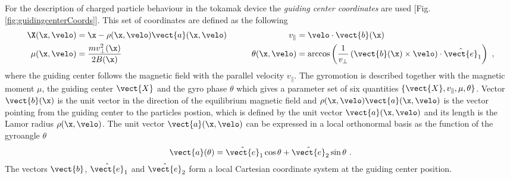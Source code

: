 For the description of charged particle behaviour in the tokamak device the \textit{guiding center coordinates} are used [Fig. \ref{fig:guidingcenterCoords}]. This set of coordinates are defined as the following
\begin{gather}
    \begin{aligned}
        \X(\x,\velo) &= \x - \rho(\x,\velo)\vect{a}(\x,\velo) &\qquad v_\parallel &= \velo \cdot \vect{b}(\x) \\
        \mu(\x,\velo) &= \frac{m v_\perp^2(\x)}{2B(\x)} &\qquad \theta(\x,\velo) &= \arccos\left(\frac{1}{v_\perp}\left(\vect{b}(\x) \times \velo\right)\cdot \hat{\vect{e}}_1\right)~,\\
    \end{aligned}
    \label{eq:guidingcenterCoords}
\end{gather}
where the guiding center follows the magnetic field with the parallel velocity $v_{\parallel}$. The gyromotion is described together with the magnetic moment $\mu$, the guiding center $\vect{X}$ and the gyro phase $\theta$ which gives a parameter set of six quantities $\{\vect{X}, v_{\parallel}, \mu, \theta\}$. Vector $\vect{b}(\x)$ is the unit vector in the direction of the equilibrium magnetic field and $\rho(\x,\velo)\vect{a}(\x,\velo)$ is the vector pointing from the guiding center to the particles postion, which is defined by the unit vector $\vect{a}(\x,\velo)$ and its length is the Lamor radius $\rho(\x,\velo)$. The unit vector $\vect{a}(\x,\velo)$ can be expressed in a local orthonormal basis as the function of the gyroangle $\theta$ 
\begin{gather}
    \vect{a}(\theta) = \hat{\vect{e}}_1 \cos\theta + \hat{\vect{e}}_2 \sin\theta~.
    \label{eq:guidingcenterUnitvect}
\end{gather} 
The vectors $\vect{b}$, $\hat{\vect{e}}_1$ and $\hat{\vect{e}}_2$ form a local Cartesian coordinate system at the guiding center position. 

\begin{center}
    \captionsetup{type=figure}
    
    \label{fig:guidingcenterCoords}
\end{center}
\newpage

